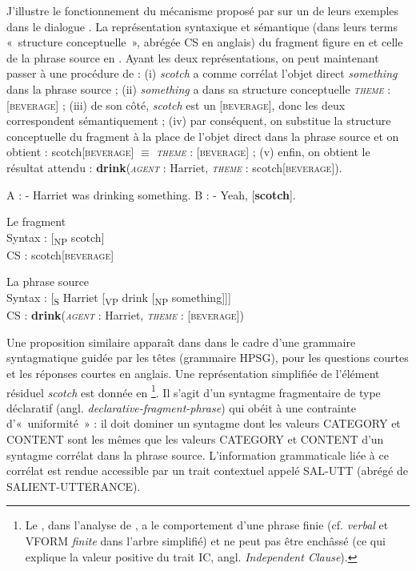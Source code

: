 J’illustre le fonctionnement du mécanisme proposé par \citet{CulicoverEtAl2005} sur un de leurs exemples dans le dialogue . La représentation syntaxique et sémantique (dans leurs terms «~structure conceptuelle~», abrégée CS en anglais) du fragment figure en  et celle de la phrase source en . Ayant les deux représentations, on peut maintenant passer à une procédure de  : (i) \textit{scotch} a comme corrélat l’objet direct \textit{something} dans la phrase {source ;} (ii) \textit{something} a dans sa structure conceptuelle \textit{\textsc{theme}} : [\textsc{beverage}] ; (iii) de son côté, \textit{scotch} est un [\textsc{beverage}], donc les deux correspondent sémantiquement ; (iv) par conséquent, on substitue la structure conceptuelle du fragment à la place de l’objet direct dans la phrase source et on obtient : scotch[\textsc{beverage}] ${\equiv}$ {\textit{\textsc{theme}} :} [\textsc{beverage}] ; (v) enfin, on obtient le résultat attendu : \textbf{drink}(\textit{\textsc{agent}} : Harriet, \textit{\textsc{theme}} : scotch[\textsc{beverage}]).

  
\ea \label{ch1:ex143}
\ea A : - Harriet was drinking something. 
\ex B : - Yeah, [\textbf{scotch}]. \label{ch1:ex143b}
\z
\z

\ea \label{ch1:ex144}
Le fragment\\
Syntax : [\textsubscript{NP} scotch]\\ 
CS : scotch[\textsc{beverage}]
\z

\ea \label{ch1:ex145}
La phrase source\\
Syntax : [\textsubscript{S} Harriet [\textsubscript{VP} drink [\textsubscript{NP} something]]]\\
CS : \textbf{drink}(\textit{\textsc{agent}} : Harriet, \textit{\textsc{theme}} : [\textsc{beverage}])
\z

Une proposition similaire apparaît dans \citet{GinzburgEtAl2000} dans le cadre d’une grammaire syntagmatique guidée par les têtes (grammaire HPSG), pour les questions courtes et les réponses courtes en anglais. Une représentation simplifiée de l’élément résiduel \textit{scotch} est donnée en \footnote{Le , dans l’analyse de \citet{GinzburgEtAl2000}, a le comportement d’une phrase finie (cf. \textit{verbal}  et VFORM \textit{finite} dans l’arbre simplifié) et ne peut pas être enchâssé (ce qui explique la valeur positive du trait IC, angl. \textit{Independent Clause}).}. Il s’agit d’un syntagme fragmentaire de type déclaratif (angl. \textit{declarative-fragment-phrase}) qui obéit à une contrainte d’«~uniformité~» : il doit dominer un syntagme dont les valeurs CATEGORY et CON\-TENT sont les mêmes que les valeurs CATEGORY et CON\-TENT d’un syntagme corrélat dans la phrase source. L’information grammaticale liée à ce corrélat est rendue accessible par un trait contextuel appelé SAL-UTT (abrégé de SALIENT-UTTERANCE). 

